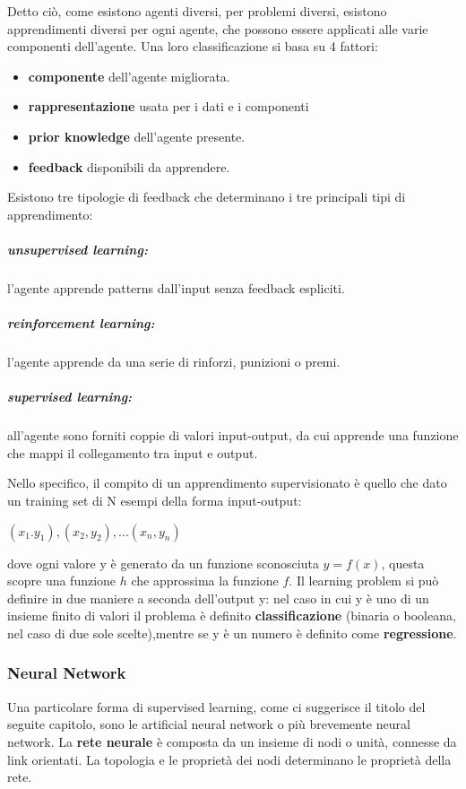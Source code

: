 \documentclass[14pt]{extarticle}
\begin{document}
Detto ciò, come esistono agenti diversi, per problemi diversi, esistono apprendimenti diversi per ogni agente, che possono essere applicati alle varie componenti dell'agente.
Una loro classificazione si basa su 4 fattori:
\begin{itemize}
\item \textbf{componente} dell'agente migliorata.
\item \textbf{rappresentazione} usata per i dati e i componenti
\item \textbf{prior knowledge} dell'agente presente.
\item \textbf{feedback}  disponibili da apprendere. 
\end{itemize} 

Esistono tre tipologie di feedback che determinano i tre principali tipi di apprendimento:
\subparagraph{unsupervised learning:} l'agente apprende patterns dall'input senza feedback espliciti. 
\subparagraph{reinforcement learning:} l'agente apprende da una serie di rinforzi, punizioni o premi.
\subparagraph{supervised learning:} all'agente sono forniti coppie di valori input-output, da cui apprende una funzione che mappi il collegamento tra input e output. 

Nello specifico, il compito di un apprendimento supervisionato è quello che dato un training set di N esempi della forma input-output:
\begin{center}
$(x_{1}.y_{1}),(x_{2},y_{2}),...(x_{n},y_{n})$
\end{center}
dove ogni valore y è generato da un funzione sconosciuta $y=f(x)$, questa scopre una funzione $h$ che approssima la funzione $f$.  
Il learning problem si può definire in due maniere a seconda dell'output y: nel caso in cui  y è uno di  un insieme finito di valori il problema è definito  \textbf{classificazione} (binaria o booleana, nel caso di due sole scelte),mentre se y è un numero
 è definito come \textbf{regressione}.
 
\subsubsection{Neural Network}
Una particolare forma di supervised learning, come ci suggerisce il titolo del seguite capitolo, sono le artificial neural network o più brevemente neural network. 
La \textbf{rete neurale} è composta da un insieme di nodi o unità, connesse da link orientati.\cite{russell2005intelligenza}
 La topologia e le proprietà dei nodi determinano le proprietà della rete.
\end{document}
